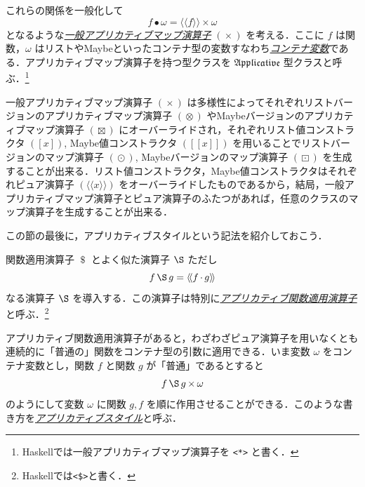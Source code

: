 \documentclass[a4paper]{jsbook}
\def\[{\left[\!\left[}
\def\]{\right]\!\right]}
\newcommand{\programminglanguage}[1]{\textsf{#1}}
\newcommand{\haskell}{\programminglanguage{Haskell}}
\newcommand{\keyword}[1]{{\underline{\emph{#1}}}}
\newcommand{\code}[1]{\texttt{#1}}
\newcommand{\mSpecialTypeClass}[1]{\mathfrak{#1}} %
\newcommand{\mApplicativeTypeClass}{\mSpecialTypeClass{Applicative}}
\newcommand{\mListWith}[1]{\left[#1\right]}
\newcommand{\mMaybeWith}[1]{\[#1\]}
\newcommand{\mPureWith}[1]{\langle\!\langle#1\rangle\!\rangle}
\DeclareMathOperator{\mComp}{\cdot}
\DeclareMathOperator{\mApply}{\$}
\DeclareMathOperator{\mMap}{\bullet}
\DeclareMathOperator{\mMapList}{\odot}
\DeclareMathOperator{\mMapMaybe}{\boxdot}
\DeclareMathOperator{\mApplicativeApply}{\S}
\DeclareMathOperator{\mApplicativeMap}{\times}
\DeclareMathOperator{\mApplicativeMapList}{\otimes}
\DeclareMathOperator{\mApplicativeMapMaybe}{\boxtimes}
\begin{document}
これらの関係を一般化して
\begin{equation}
f\mMap\omega=\mPureWith{f}\mApplicativeMap\omega
\end{equation}
となるような\keyword{一般アプリカティブマップ演算子} $(\mApplicativeMap)$ を考える．ここに $f$ は関数，$\omega$ はリストやMaybeといったコンテナ型の変数すなわち\keyword{コンテナ変数}である．アプリカティブマップ演算子を持つ型クラスを $\mApplicativeTypeClass$ 型クラスと呼ぶ．\footnote{\haskell では一般アプリカティブマップ演算子を \code{<*>} と書く．}


一般アプリカティブマップ演算子 $(\mApplicativeMap)$ は多様性によってそれぞれリストバージョンのアプリカティブマップ演算子 $(\mApplicativeMapList)$ やMaybeバージョンのアプリカティブマップ演算子 $(\mApplicativeMapMaybe)$ にオーバーライドされ，それぞれリスト値コンストラクタ $(\mListWith{x})$, Maybe値コンストラクタ $(\mMaybeWith{x})$ を用いることでリストバージョンのマップ演算子 $(\mMapList)$, Maybeバージョンのマップ演算子 $(\mMapMaybe)$ を生成することが出来る．リスト値コンストラクタ，Maybe値コンストラクタはそれぞれピュア演算子 $(\mPureWith{x})$ をオーバーライドしたものであるから，結局，一般アプリカティブマップ演算子とピュア演算子のふたつがあれば，任意のクラスのマップ演算子を生成することが出来る．




この節の最後に，アプリカティブスタイルという記法を紹介しておこう．

関数適用演算子 $\mApply$ とよく似た演算子 $\mApplicativeApply$ ただし
\begin{equation}
f\mApplicativeApply g=\mPureWith{f\mComp g}
\end{equation}
なる演算子 $\mApplicativeApply$ を導入する．この演算子は特別に\keyword{アプリカティブ関数適用演算子}と呼ぶ．\footnote{\haskell では\code{<\$>}と書く．}

アプリカティブ関数適用演算子があると，わざわざピュア演算子を用いなくとも連続的に「普通の」関数をコンテナ型の引数に適用できる．いま変数 $\omega$ をコンテナ変数とし，関数 $f$ と関数 $g$ が「普通」であるとすると
\begin{equation}
f\mApplicativeApply g\mApplicativeMap\omega
\end{equation}
のようにして変数 $\omega$ に関数 $g,f$ を順に作用させることができる．このような書き方を\keyword{アプリカティブスタイル}と呼ぶ．
\end{document}
